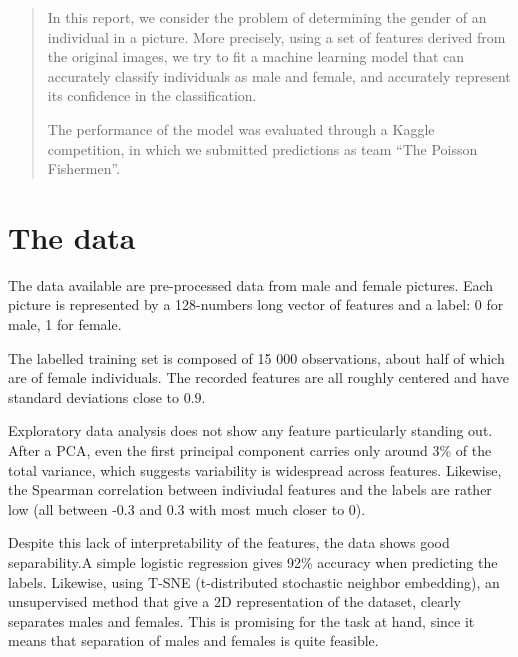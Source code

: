 \documentclass[a4paper,11pt,openany,extrafontsizes,oneside,article]{memoir}
\begin{document}
\tightlists%

\maketitle

\setlength{\beforechapskip}{30pt}
\renewcommand{\chapnamefont}{\sffamily\LARGE\scshape}
\renewcommand{\chapnumfont}{\sffamily\LARGE\scshape}
\renewcommand{\chaptitlefont}{\sffamily\LARGE\scshape}

\tableofcontents*

\begin{abstract}
  In this report, we consider the problem of determining the gender of
  an individual in a picture. More precisely, using a set of features
  derived from the original images, we try to fit a machine learning
  model that can accurately classify individuals as male and female,
  and accurately represent its confidence in the classification.

  The performance of the model was evaluated through a Kaggle
  competition, in which we submitted predictions as team ``The Poisson
  Fishermen''.
\end{abstract}

\newpage

\chapter{The data}

The data available are pre-processed data from male and female
pictures. Each picture is represented by a 128-numbers long vector of
features and a label: 0 for male, 1 for female.
    
The labelled training set is composed of 15 000 observations, about
half of which are of female individuals. The recorded features are all
roughly centered and have standard deviations close to $0.9$.
    
Exploratory data analysis does not show any feature particularly
standing out. After a PCA, even the first principal component carries
only around 3\% of the total variance, which suggests variability is
widespread across features. Likewise, the Spearman correlation between
indiviudal features and the labels are rather low (all between -0.3
and 0.3 with most much closer to 0).
    
Despite this lack of interpretability of the features, the data shows
good separability.A simple logistic regression gives 92\% accuracy
when predicting the labels. Likewise, using T-SNE (t-distributed
stochastic neighbor embedding), an unsupervised method that give a 2D
representation of the dataset, clearly separates males and
females. This is promising for the task at hand, since it means that
separation of males and females is quite feasible.
\end{document}
